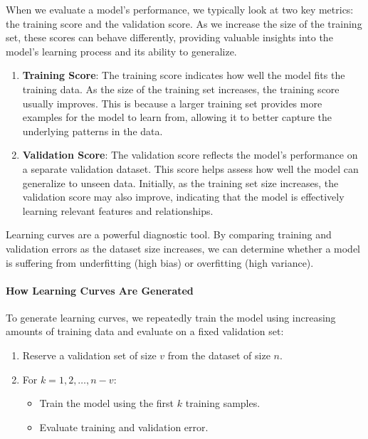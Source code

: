 \documentclass{article}
\begin{document}
When we evaluate a model’s performance, we typically look at two key metrics: the training score and the validation score. As we increase the size of the training set, these scores can behave differently, providing valuable insights into the model’s learning process and its ability to generalize.

\begin{enumerate}
    \item \textbf{Training Score}: The training score indicates how well the model fits the training data. As the size of the training set increases, the training score usually improves. This is because a larger training set provides more examples for the model to learn from, allowing it to better capture the underlying patterns in the data.
    \item \textbf{Validation Score}: The validation score reflects the model's performance on a separate validation dataset. This score helps assess how well the model can generalize to unseen data. Initially, as the training set size increases, the validation score may also improve, indicating that the model is effectively learning relevant features and relationships.


\end{enumerate}


Learning curves are a powerful diagnostic tool. By comparing training and validation 
errors as the dataset size increases, we can determine whether a model is suffering 
from underfitting (high bias) or overfitting (high variance).



\paragraph{How Learning Curves Are Generated}

To generate learning curves, we repeatedly train the model using increasing
amounts of training data and evaluate on a fixed validation set:

\begin{enumerate}
    \item Reserve a validation set of size $v$ from the dataset of size $n$.
    \item For $k = 1, 2, \dots, n-v$:
    \begin{itemize}
        \item Train the model using the first $k$ training samples.
        \item Evaluate training and validation error.
    \end{itemize}
\end{enumerate}
\end{document}
